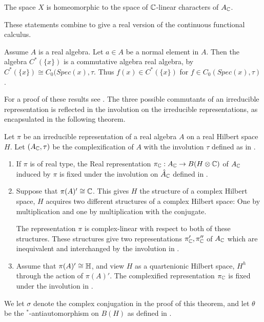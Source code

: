 \begin{remark}
	The space $X$ is homeomorphic to the space of $\mathbb{C}$-linear characters of $A_{\mathbb{C}}$. 
\end{remark}
These statements combine to give a real version of the continuous functional calculus. 
\begin{proposition}
	Assume $A$ is a real \Cstar algebra. Let $a\in A$ be a normal element in $A$. Then the algebra $C^*(\{x\})$ is a commutative algebra real \Cstar algebra, by  $C^*(\{x\})\cong C_0(Spec(x),\tau$. Thus $f(x)\in C^*(\{x\})$ for $f \in C_0(Spec(x),\tau)$. 
\end{proposition}
For a proof of these results see \cite{goodearl}. 
The three possible commutants of an irreducible representation is reflected in the involution on the irreducible representations, as encapsulated in the following theorem. 
\begin{theorem}
	Let $\pi$ be an irreducible representation of a real \Cstar algebra $A$ on a real Hilbert space $H$. Let $(A_{\mathbb{C}},\tau)$ be the complexification of $A$ with the involution $\tau$ defined as in .
	\begin{enumerate}
	\item If $\pi$ is of real type, the Real representation $\pi_{\mathbb{C}}:A_{\mathbb{C}}\to B(H\otimes \mathbb{C})$ of $A_{\mathbb{C}}$ induced by $\pi$ is fixed under the involution on $\hat{A}_{\mathbb{C}}$ defined in . 
	\item Suppose that $\pi(A)'\cong \mathbb{C}$. This gives $H$ the structure of a complex Hilbert space, $H$ acquires two different structures of a complex Hilbert space: One by multiplication and one by multiplication with the conjugate. 
	
	The representation $\pi$ is complex-linear with respect to both  of these structures. These structures give two representations $\pi_{\mathbb{C}}',\pi_{\mathbb{C}}''$ of $A_{\mathbb{C}}$ which are inequivalent and interchanged by the involution in . 
	\item Assume that $\pi(A)'\cong \mathbb{H}$, and view $H$ as a quartenionic Hilbert space, $H^h$ through the action of $\pi(A)'$. The complexified representation $\pi_{\mathbb{C}}$ is fixed under the involution in .
\end{enumerate}	
We let $\sigma$ denote the complex conjugation in the proof of this theorem, and let $\theta$ be the $^*$-antiautomorphism on $B(H)$ as defined in . 
\end{theorem}
